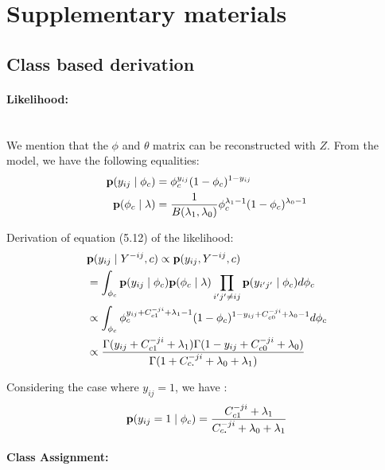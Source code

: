 \section{Supplementary materials}

\subsection{Class based derivation}

\paragraph{Likelihood:}~\\

We mention that  the $\phi$ and $\theta$ matrix can be reconstructed with $Z$. From the model, we have the following equalities:
\begin{align}
\mathbf{p}(y_{ij} \mid \phi_c) &= \phi_c^{y_{ij}}(1-\phi_c)^{1-y_{ij}} \\
\mathbf{p}(\phi_c \mid \lambda) &= \frac{1}{B(\lambda_1, \lambda_0)} \phi_c^{\lambda_1-1}(1-\phi_c)^{\lambda_0 -1}
\end{align}


Derivation of equation (5.12) of the likelihood:
\begin{align}
&\mathbf{p}(y_{ij} \mid Y^{-ij}, c) \propto \mathbf{p}(y_{ij}, Y^{-ij}, c) \\
&= \int_{\phi_c} \mathbf{p}(y_{ij} \mid \phi_c) \mathbf{p}(\phi_c \mid \lambda) \prod_{i'j' \neq ij}\mathbf{p}(y_{i'j'} \mid \phi_c) d\phi_c \\
&\propto \int_{\phi_c} \phi_c^{y_{ij} + C_{c1}^{-ji} + \lambda_1-1}(1-\phi_c)^{ 1-y_{ij} + C_{c0}^{-ji} + \lambda_0 -1} d\phi_c \\
&\propto \frac{\Gamma(y_{ij} + C_{c1}^{-ji} + \lambda_1) \Gamma( 1-y_{ij} + C_{c0}^{-ji} + \lambda_0) }{\Gamma(  1+ C_{c\bm{.}}^{-ji} + \lambda_0 + \lambda_1)}
\end{align}

Considering the case where $y_{ij} =1$, we have :
\begin{equation}
\mathbf{p}(y_{ij}=1 \mid \phi_c) = \frac{C_{c1}^{-ji} + \lambda_1}{C_{c\bm{.}}^{-ji} + \lambda_0 + \lambda_1}
\end{equation}


\paragraph{Class Assignment:}~\\

